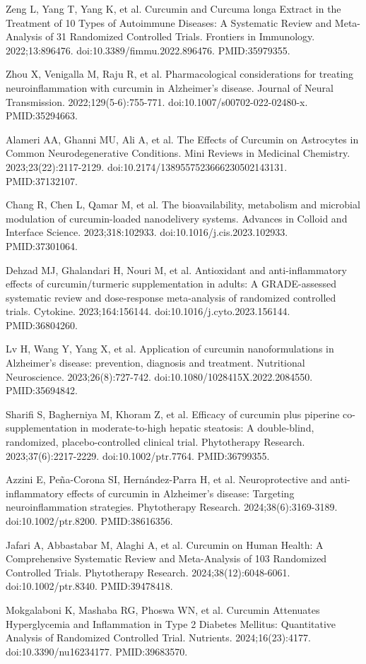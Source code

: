 \documentclass[11pt,oneside]{book}
\newcommand{\reff}[2]{\par\hangindent=7mm\hangafter=1\noindent[#1]\hspace{2mm}#2\par}
\begin{document}
\reff{22}{Zeng L, Yang T, Yang K, et al. Curcumin and Curcuma longa Extract in the Treatment of 10 Types of Autoimmune Diseases: A Systematic Review and Meta-Analysis of 31 Randomized Controlled Trials. Frontiers in Immunology. 2022;13:896476. doi:10.3389/fimmu.2022.896476. PMID:35979355.}
\reff{23}{Zhou X, Venigalla M, Raju R, et al. Pharmacological considerations for treating neuroinflammation with curcumin in Alzheimer's disease. Journal of Neural Transmission. 2022;129(5-6):755-771. doi:10.1007/s00702-022-02480-x. PMID:35294663.}
\reff{24}{Alameri AA, Ghanni MU, Ali A, et al. The Effects of Curcumin on Astrocytes in Common Neurodegenerative Conditions. Mini Reviews in Medicinal Chemistry. 2023;23(22):2117-2129. doi:10.2174/1389557523666230502143131. PMID:37132107.}
\reff{25}{Chang R, Chen L, Qamar M, et al. The bioavailability, metabolism and microbial modulation of curcumin-loaded nanodelivery systems. Advances in Colloid and Interface Science. 2023;318:102933. doi:10.1016/j.cis.2023.102933. PMID:37301064.}
\reff{26}{Dehzad MJ, Ghalandari H, Nouri M, et al. Antioxidant and anti-inflammatory effects of curcumin/turmeric supplementation in adults: A GRADE-assessed systematic review and dose-response meta-analysis of randomized controlled trials. Cytokine. 2023;164:156144. doi:10.1016/j.cyto.2023.156144. PMID:36804260.}
\reff{27}{Lv H, Wang Y, Yang X, et al. Application of curcumin nanoformulations in Alzheimer's disease: prevention, diagnosis and treatment. Nutritional Neuroscience. 2023;26(8):727-742. doi:10.1080/1028415X.2022.2084550. PMID:35694842.}
\reff{28}{Sharifi S, Bagherniya M, Khoram Z, et al. Efficacy of curcumin plus piperine co-supplementation in moderate-to-high hepatic steatosis: A double-blind, randomized, placebo-controlled clinical trial. Phytotherapy Research. 2023;37(6):2217-2229. doi:10.1002/ptr.7764. PMID:36799355.}
\reff{29}{Azzini E, Peña-Corona SI, Hernández-Parra H, et al. Neuroprotective and anti-inflammatory effects of curcumin in Alzheimer's disease: Targeting neuroinflammation strategies. Phytotherapy Research. 2024;38(6):3169-3189. doi:10.1002/ptr.8200. PMID:38616356.}
\reff{30}{Jafari A, Abbastabar M, Alaghi A, et al. Curcumin on Human Health: A Comprehensive Systematic Review and Meta-Analysis of 103 Randomized Controlled Trials. Phytotherapy Research. 2024;38(12):6048-6061. doi:10.1002/ptr.8340. PMID:39478418.}
\reff{31}{Mokgalaboni K, Mashaba RG, Phoswa WN, et al. Curcumin Attenuates Hyperglycemia and Inflammation in Type 2 Diabetes Mellitus: Quantitative Analysis of Randomized Controlled Trial. Nutrients. 2024;16(23):4177. doi:10.3390/nu16234177. PMID:39683570.}
\end{document}
